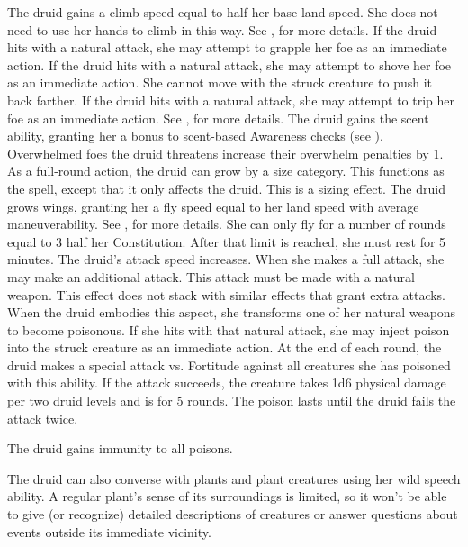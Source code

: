 The druid gains a climb speed equal to half her base land speed.
She does not need to use her hands to climb in this way.
See , for more details.
If the druid hits with a natural attack, she may attempt to grapple her foe as an immediate action.
If the druid hits with a natural attack, she may attempt to shove her foe as an immediate action.
She cannot move with the struck creature to push it back farther.
If the druid hits with a natural attack, she may attempt to trip her foe as an immediate action.
See , for more details.
The druid gains the scent ability, granting her a  bonus to scent-based Awareness checks (see ).
Overwhelmed foes the druid threatens increase their overwhelm penalties by 1.
As a full-round action, the druid can grow by a size category.
This functions as the  spell, except that it only affects the druid.
This is a sizing effect.
The druid grows wings, granting her a fly speed equal to her land speed with average maneuverability.
See , for more details.
She can only fly for a number of rounds equal to 3 \add half her Constitution.
After that limit is reached, she must rest for 5 minutes.
The druid's attack speed increases.
When she makes a full attack, she may make an additional attack.
This attack must be made with a natural weapon.
This effect does not stack with similar effects that grant extra attacks.
When the druid embodies this aspect, she transforms one of her natural weapons to become poisonous.
If she hits with that natural attack, she may inject poison into the struck creature as an immediate action.
At the end of each round, the druid makes a special attack vs. Fortitude against all creatures she has poisoned with this ability.
If the attack succeeds, the creature takes 1d6 physical damage per two druid levels and is \sickened for 5 rounds.
The poison lasts until the druid fails the attack twice.

The druid gains immunity to all poisons.

The druid can also converse with plants and plant creatures using her wild speech ability.
A regular plant's sense of its surroundings is limited, so it won't be able to give (or recognize) detailed descriptions of creatures or answer questions about events outside its immediate vicinity.

